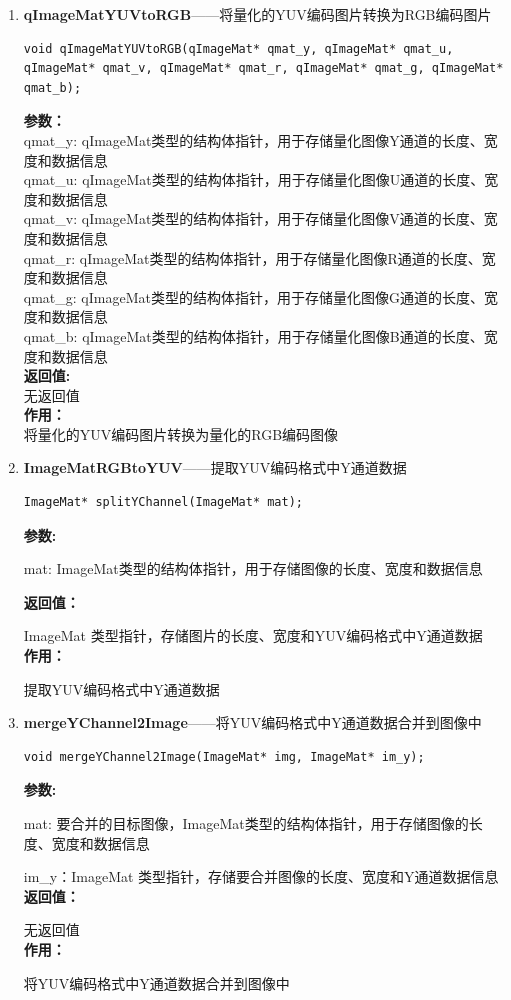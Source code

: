 \documentclass[12pt, a4paper, oneside]{ctexbook}
\begin{document}
\begin{enumerate}
			\item \textbf{qImageMatYUVtoRGB}——将量化的YUV编码图片转换为RGB编码图片
				\begin{lstlisting}
void qImageMatYUVtoRGB(qImageMat* qmat_y, qImageMat* qmat_u, qImageMat* qmat_v, qImageMat* qmat_r, qImageMat* qmat_g, qImageMat* qmat_b);
				\end{lstlisting}
				\textbf{参数：} \\
					qmat\_y: qImageMat类型的结构体指针，用于存储量化图像Y通道的长度、宽度和数据信息 \\ 
					qmat\_u: qImageMat类型的结构体指针，用于存储量化图像U通道的长度、宽度和数据信息 \\
					qmat\_v: qImageMat类型的结构体指针，用于存储量化图像V通道的长度、宽度和数据信息 \\
					qmat\_r: qImageMat类型的结构体指针，用于存储量化图像R通道的长度、宽度和数据信息 \\ 
					qmat\_g: qImageMat类型的结构体指针，用于存储量化图像G通道的长度、宽度和数据信息 \\ 
					qmat\_b: qImageMat类型的结构体指针，用于存储量化图像B通道的长度、宽度和数据信息 \\ 
				\textbf{返回值:} \\ 无返回值 \\
				\textbf{作用：} \\ 将量化的YUV编码图片转换为量化的RGB编码图像
			
			
			\item \textbf{ImageMatRGBtoYUV}——提取YUV编码格式中Y通道数据
				\begin{lstlisting}[numbers=none]
ImageMat* splitYChannel(ImageMat* mat);
				\end{lstlisting}
				\textbf{参数:} \par mat: ImageMat类型的结构体指针，用于存储图像的长度、宽度和数据信息\par 
				\textbf{返回值：}\par ImageMat 类型指针，存储图片的长度、宽度和YUV编码格式中Y通道数据 \\
				\textbf{作用：}\par 提取YUV编码格式中Y通道数据 \\

			\item \textbf{mergeYChannel2Image}——将YUV编码格式中Y通道数据合并到图像中
				\begin{lstlisting}[numbers=none]
void mergeYChannel2Image(ImageMat* img, ImageMat* im_y);
				\end{lstlisting}
				\textbf{参数:} \par mat: 要合并的目标图像，ImageMat类型的结构体指针，用于存储图像的长度、宽度和数据信息\par im\_y：ImageMat 类型指针，存储要合并图像的长度、宽度和Y通道数据信息 \\
				\textbf{返回值：}\par 无返回值 \\
				\textbf{作用：}\par 将YUV编码格式中Y通道数据合并到图像中 \\			


\end{enumerate}
\end{document}
